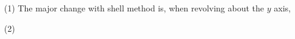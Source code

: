 \documentclass[12pt]{report}
\newcommand{\R}{\mathbb R}
\begin{document}
\begin{itemize}

\item[(1)] The major change with shell method is, when revolving about the $y$ axis, 

\bigskip

\item[(2)] %

\end{itemize}

\vspace{-.25in}

%
%
%
%
%
%

%
%
%
%
%
%
%
%
\end{document}

